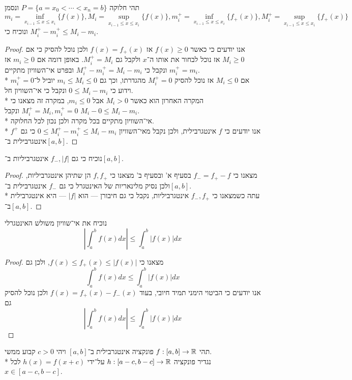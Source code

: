 \Subquestion{}
תהי חלוקה $P = \{a = x_0 < \cdots < x_n = b \}$ ונסמן
\[
	m_i = \inf_{x_{i - 1} \le x \le x_i} \{ f(x) \},
	M_i = \sup_{x_{i - 1} \le x \le x_i} \{ f(x) \},
	m_i^+ = \inf_{x_{i - 1} \le x \le x_i} \{ f_+(x) \},
	M_i^+ = \sup_{x_{i - 1} \le x \le x_i} \{ f_+(x) \}
\]
ונוכיח כי $M_i^+ - m_i^+ \le M_i - m_i$.
\begin{proof}
	אנו יודעים כי כאשר $f(x) \ge 0$ אז $f(x) = f_+(x)$ ולכן נוכל להסיק כי אם $M_i \ge 0$ אז נוכל לבחור את אותו ה־$x$ ולקבל גם $M_i^+ = M_i$.
	באופן דומה אם $m_i \ge 0$ אז $m_i^+ = m_i$ ונקבל כי $M_i^+ - m_i^+ = M_i - m_i$ ובפרט אי־השוויון מתקיים. \\*
	אם $M_i \le 0$ אז נוכל להסיק $M_i^+ = 0$ מהגדרתו, וכך גם $m_i \le M_i \le 0$ יוביל ל־$m_i^+ = 0$ וידוע כי $0 \le M_i - m_i$ ונקבל כי אי־השוויון חל. \\*
	המקרה האחרון הוא כאשר $M_i > 0$ אבל $m_i \le 0$, במקרה זה מצאנו כי $M_i^+ = M_i, m_i^+ = 0$ ונקבל $M_i - 0 \le M_i - m_i$. \\*
	אי־השוויון מתקיים בכל מקרה ולכן נכון לכל החלוקה. \\*
	אנו יודעים כי $f$ אינטגרבילית, ולכן נקבל מאי־השוויון $0 \le M_i^+ - m_i^+ \le M_i - m_i$ כי גם $f^+$ אינטגרבילית ב־$[a, b]$.
\end{proof}

\Subquestion{}
נוכיח כי גם $f_-, |f|$ אינטגרביליות ב־$[a, b]$.
\begin{proof}
	מצאנו כי $f_- = f_+ - f$ בסעיף א' ובסעיף ב' מצאנו כי $f, f_+$ הן שתיהן אינטגרביליות, ולכן נסיק מלינאריות של האינטגרל כי גם $f_-$ אינטגרבילית ב־$[a, b]$. \\*
	עתה כשמצאנו כי $f_-, f_+$ אינטגרביליות, נקבל כי גם חיבורן --- הוא $|f|$ --- היא אינטגרבילית ב־$[a, b]$.
\end{proof}

\Subquestion{}
נוכיח את אי־שוויון משולש האינטגרלי
\[
	\left\lvert \int_{a}^{b} f(x) dx \right\rvert
	\le \int_{a}^{b} |f(x)| dx
\]
\begin{proof}
	מצאנו כי $f(x) \le f_+(x) \le |f(x)|$, ולכן גם
	\[
		\int_{a}^{b} f(x) dx \le \int_{a}^{b} |f(x)| dx
	\]
	אנו יודעים כי הביטוי הימני תמיד חיובי, בעוד $f(x) = f_+(x) - f_-(x)$ ולכן נוכל להסיק גם
	\[
		\left\lvert \int_{a}^{b} f(x) dx \right\rvert \le \int_{a}^{b} |f(x)| dx
	\]
\end{proof}

\Question{}
תהי $f : [a, b] \to \mathbb{R}$ פונקציה אינטגרבילית ב־$[a, b]$ ויהי $c > 0$ קבוע ממשי. \\*
נגדיר פונקציה $h : [a - c, b - c] \to \mathbb{R}$ על־ידי $h(x) = f(x + c)$ לכל $x \in [a - c, b - c]$.


